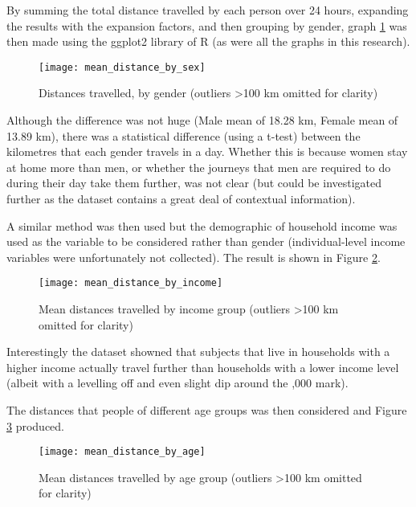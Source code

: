 By summing the total distance travelled by each person over 24 hours, expanding the results with the expansion factors, and then grouping by gender, graph \ref{fig:mean_distance_by_sex} was then made using the ggplot2 library of R (as were all the graphs in this research).

\begin{figure}[H]
\centering
\texttt{[image: mean\_distance\_by\_sex]}
\caption{Distances travelled, by gender (outliers \textgreater 100 km omitted for clarity)}
\label{fig:mean_distance_by_sex}
\end{figure}

Although the difference was not huge (Male mean of 18.28 km, Female mean of 13.89 km), there was a statistical difference (using a t-test) between the kilometres that each gender travels in a day. Whether this is because women stay at home more than men, or whether the journeys that men are required to do during their day take them further, was not clear (but could be investigated further as the dataset contains a great deal of contextual information).

A similar method was then used but the demographic of household income was used as the variable to be considered rather than gender (individual-level income variables were unfortunately not collected). The result is shown in Figure \ref{fig:mean_distance_by_income}.

\begin{figure}[H]
\centering
\texttt{[image: mean\_distance\_by\_income]}
\caption{Mean distances travelled by income group  (outliers \textgreater 100 km omitted for clarity)}
\label{fig:mean_distance_by_income}
\end{figure}

Interestingly the dataset showned that subjects that live in households with a higher income actually travel further than households with a lower income level (albeit with a levelling off and even slight dip around the ,000 mark).

The distances that people of different age groups was then considered and Figure \ref{fig:mean_distance_by_age} produced.

\begin{landscape}

\begin{figure}[H]
\centering
\texttt{[image: mean\_distance\_by\_age]}
\caption{Mean distances travelled by age group (outliers \textgreater 100 km omitted for clarity)}
\label{fig:mean_distance_by_age}
\end{figure}

\end{landscape}

